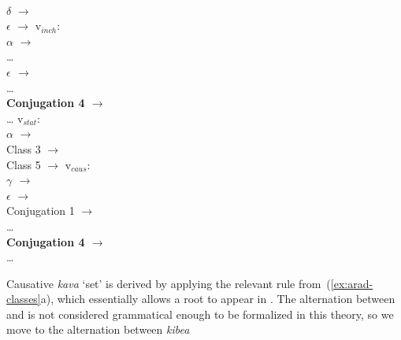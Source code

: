 \begin{exe}
\begin{xlist}
\begin{xlist}
\begin{exe}
\begin{xlist}
\begin{xlist}
\begin{exe}
\begin{xlist}
\begin{xlist}
\begin{exe}
\begin{exe}
\begin{xlist}
\begin{exe}
\begin{exe}
\begin{xlist}
\begin{exe}
\begin{exe}
\begin{exe}
\begin{exe}
\begin{exe}
\begin{xlist}
\begin{exe}
\begin{xlist}
\begin{exe}
\begin{exe}
\begin{xlist}
\begin{exe}
\begin{xlist}
\begin{exe}
\begin{xlist}
\begin{exe}
\begin{exe}
\begin{exe}
\begin{xlist}
\begin{exe}
\begin{exe}
\begin{exe}
\begin{xlist}
\begin{exe}
\begin{xlist}
\begin{exe}
\begin{exe}
\begin{xlist}
\begin{exe}
\begin{exe}
\begin{exe}
\begin{exe}
\begin{xlist}
\begin{exe}
\begin{xlist}
\begin{exe}
\begin{xlist}
\begin{exe}
\begin{xlist}
\begin{exe}
\begin{xlist}
\begin{exe}
\begin{xlist}
\begin{exe}
\begin{exe}
\begin{xlist}
\begin{exe}
\begin{xlist}
\begin{exe}
\begin{exe}
\begin{xlist}
\begin{exe}
\begin{xlist}
\begin{exe}
\begin{exe}
\begin{exe}
\begin{exe}
\begin{xlist}
\begin{xlist}
\begin{exe}
\begin{xlist}
\begin{exe}
\begin{exe}
\begin{exe}
\begin{xlist}
\begin{exe}
\begin{exe}
\begin{xlist}
\begin{exe}
\begin{exe}
\begin{exe}
\begin{xlist}
\begin{xlist}
\begin{exe}
\begin{xlist}
\begin{exe}
\begin{exe}
\begin{exe}
\begin{exe}
\begin{xlist}
\begin{exe}
\begin{xlist}
\begin{exe}
\begin{xlist}
\begin{exe}
\begin{xlist}
\begin{exe}
\begin{exe}
\begin{exe}
\begin{exe}
\begin{exe}
\begin{xlist}
\begin{exe}
\begin{xlist}
\begin{exe}
\begin{xlist}
\begin{xlist}
\begin{exe}
\begin{xlist}
\begin{exe}
\begin{xlist}
\begin{exe}
\begin{xlist}
\begin{exe}
\begin{xlist}
\begin{multicols}{2}
{\tpie}\\
			$\delta$ $\rightarrow$ {\thif}\\
			$\epsilon$ $\rightarrow$ {\thit}
 	\ex  v$_{inch}$: \\
			$ \alpha$ $\rightarrow$ {\tkal} \\
			\dots \\
			\textbf{$\epsilon$ $\rightarrow$ {\thit}}\\
			\dots \\
			\textbf{Conjugation 4 $\rightarrow$ {\thit}}\\
			\dots
		\columnbreak
 	\ex  v$_{stat}$: \\
			$ \alpha$ $\rightarrow$ {\tkal} \\
			Class 3 $\rightarrow$ {\tkal}\\
			Class 5 $\rightarrow$ {\tkal}
 	\ex  v$_{caus}$: \\
			\textbf{$\gamma$ $\rightarrow$ {\tpie}}\\
			$\epsilon$ $\rightarrow$ {\thif}\\
			Conjugation 1 $\rightarrow$ {\tkal}\\
			\dots \\
			\textbf{Conjugation 4 $\rightarrow$ {\tpie}}\\
			\dots
	\end{multicols}
 \z
\z 

Causative \emph{kava} `set' is derived by applying the relevant rule from~(\ref{ex:arad-classes}a), which essentially allows a root to appear in {\tkal}. The alternation between {\tkal} and {\tpie} is not considered grammatical enough to be formalized in this theory, so we move to the alternation between \emph{kibea} 
\end{xlist}
\end{exe}
\end{xlist}
\end{exe}
\end{xlist}
\end{exe}
\end{xlist}
\end{exe}
\end{xlist}
\end{xlist}
\end{exe}
\end{xlist}
\end{exe}
\end{xlist}
\end{exe}
\end{exe}
\end{exe}
\end{exe}
\end{exe}
\end{xlist}
\end{exe}
\end{xlist}
\end{exe}
\end{xlist}
\end{exe}
\end{xlist}
\end{exe}
\end{exe}
\end{exe}
\end{exe}
\end{xlist}
\end{exe}
\end{xlist}
\end{xlist}
\end{exe}
\end{exe}
\end{exe}
\end{xlist}
\end{exe}
\end{exe}
\end{xlist}
\end{exe}
\end{exe}
\end{exe}
\end{xlist}
\end{exe}
\end{xlist}
\end{xlist}
\end{exe}
\end{exe}
\end{exe}
\end{exe}
\end{xlist}
\end{exe}
\end{xlist}
\end{exe}
\end{exe}
\end{xlist}
\end{exe}
\end{xlist}
\end{exe}
\end{exe}
\end{xlist}
\end{exe}
\end{xlist}
\end{exe}
\end{xlist}
\end{exe}
\end{xlist}
\end{exe}
\end{xlist}
\end{exe}
\end{xlist}
\end{exe}
\end{exe}
\end{exe}
\end{exe}
\end{xlist}
\end{exe}
\end{exe}
\end{xlist}
\end{exe}
\end{xlist}
\end{exe}
\end{exe}
\end{exe}
\end{xlist}
\end{exe}
\end{exe}
\end{exe}
\end{xlist}
\end{exe}
\end{xlist}
\end{exe}
\end{xlist}
\end{exe}
\end{exe}
\end{xlist}
\end{exe}
\end{xlist}
\end{exe}
\end{exe}
\end{exe}
\end{exe}
\end{exe}
\end{xlist}
\end{exe}
\end{exe}
\end{xlist}
\end{exe}
\end{exe}
\end{xlist}
\end{xlist}
\end{exe}
\end{xlist}
\end{xlist}
\end{exe}
\end{xlist}
\end{xlist}
\end{exe}
